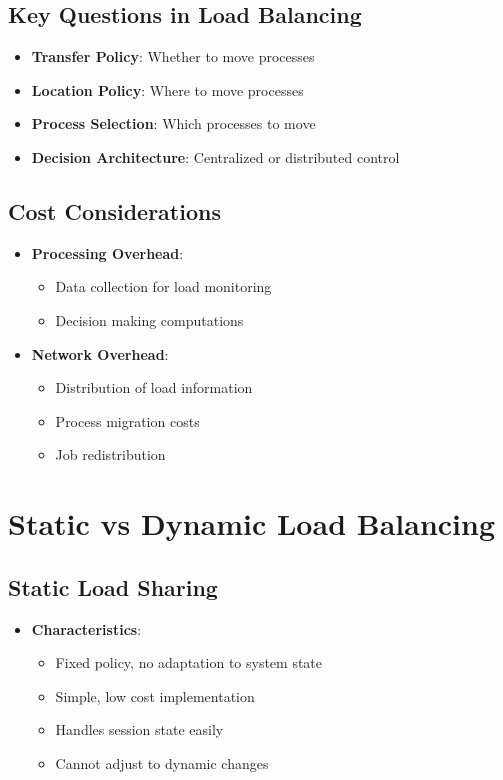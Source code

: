 \documentclass[12pt]{article}
\begin{document}
\subsection{Key Questions in Load Balancing}
\begin{itemize}
  \item \textbf{Transfer Policy}: Whether to move processes
  \item \textbf{Location Policy}: Where to move processes
  \item \textbf{Process Selection}: Which processes to move
  \item \textbf{Decision Architecture}: Centralized or distributed control
\end{itemize}

\subsection{Cost Considerations}
\begin{itemize}
  \item \textbf{Processing Overhead}:
        \begin{itemize}
          \item Data collection for load monitoring
          \item Decision making computations
        \end{itemize}

  \item \textbf{Network Overhead}:
        \begin{itemize}
          \item Distribution of load information
          \item Process migration costs
          \item Job redistribution
        \end{itemize}
\end{itemize}

\section{Static vs Dynamic Load Balancing}

\subsection{Static Load Sharing}
\begin{itemize}
  \item \textbf{Characteristics}:
        \begin{itemize}
          \item Fixed policy, no adaptation to system state
          \item Simple, low cost implementation
          \item Handles session state easily
          \item Cannot adjust to dynamic changes
        \end{itemize}
\end{itemize}
\end{document}
